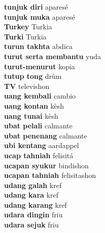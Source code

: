 \textbf{ tunjuk diri  } aparesé \\
\textbf{ tunjuk muka  } aparesé \\
\textbf{ Turkey  } Turkia \\
\textbf{ Turki  } Turkia \\
\textbf{ turun takhta  } abdica \\
\textbf{ turut serta membantu  } yuda \\
\textbf{ turut-menurut  } kopia \\
\textbf{ tutup tong  } drùm \\
\textbf{ TV  } televishon \\
\textbf{ uang kembali  } cambio \\
\textbf{ uang kontan  } kèsh \\
\textbf{ uang tunai  } kèsh \\
\textbf{ ubat pelali  } calmante \\
\textbf{ ubat penenang  } calmante \\
\textbf{ ubi kentang  } aardappel \\
\textbf{ ucap tahniah  } felisitá \\
\textbf{ ucapan syukur  } bindishon \\
\textbf{ ucapan tahniah  } felisitashon \\
\textbf{ udang galah  } kref \\
\textbf{ udang kara  } kref \\
\textbf{ udang karang  } kref \\
\textbf{ udara dingin  } friu \\
\textbf{ udara sejuk  } friu \\
